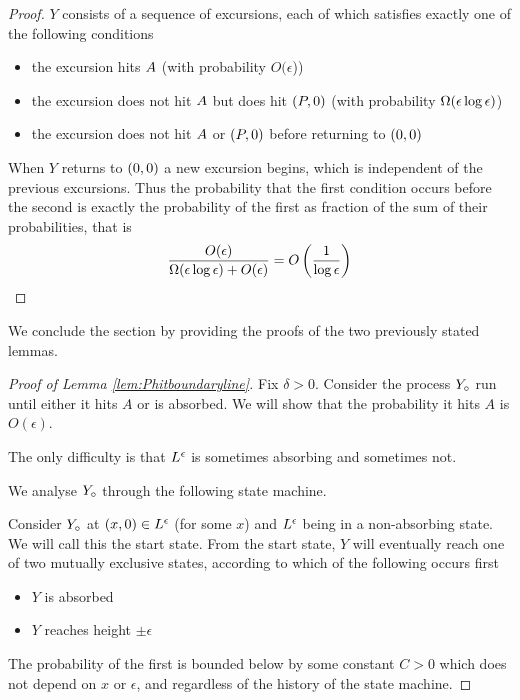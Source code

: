 {\newcommand{\Oe}{O(\epsilon)}

\begin{proof}
  $Y$ consists of a sequence of excursions, each of which satisfies
  exactly one of the following conditions
  \begin{itemize}
  \item the excursion hits $A$ (with probability
    $O(\epsilon$))
  \item the excursion does not hit $A$ but does hit
    $(P,0)$ (with probability $\Omega(\epsilon\log\epsilon)$)
  \item the excursion does not hit $A$ or $(P,0)$ before
    returning to $(0,0)$
  \end{itemize}
  When $Y$ returns to $(0,0)$ a new excursion begins, which is independent of
  the previous excursions.  Thus the probability that the first
  condition occurs before the second is exactly the probability of the
  first as fraction of the sum of their probabilities, that is
  \[
  \frac{\Oe}{\Omegaeloge + \Oe} = O\left(\frac{1}{\log\epsilon}\right)
  \]
\end{proof}

We conclude the section by providing the proofs of the two previously
stated lemmas.

\begin{proof}[Proof of Lemma \ref{lem:Phitboundaryline}]
Fix $\delta > 0$.  Consider the process $Y_\circ$ run until either
it hits $A$ or is absorbed.  We will show that the probability it
hits $A$ is $O(\epsilon)$.

The only difficulty is that $L^\epsilon$ is sometimes absorbing and
sometimes not.

We analyse $Y_\circ$ through the following state machine.

Consider $Y_\circ$ at $(x,0) \in L^\epsilon$ (for some $x$) and $L^\epsilon$ being in
a non-absorbing state.  We will call this the start state.  From the
start state, $Y$ will eventually reach one of two mutually exclusive
states, according to which of the following occurs first

\newcommand{\intermediatelines}{I}

\begin{itemize}
\item $Y$ is absorbed
\item $Y$ reaches height $\pm\epsilon$
\end{itemize}

The probability of the first is bounded below by some constant $C > 0$
which does not depend on $x$ or $\epsilon$, and regardless of the
history of the state machine.


\end{proof}}
